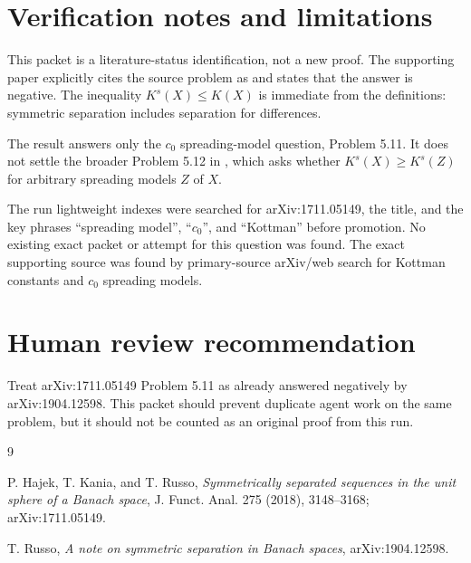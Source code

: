 \documentclass[11pt]{article}
\newcommand{\cnull}{c_0}
\newcommand{\Ks}{K^s}
\begin{document}
\section*{Verification notes and limitations}

This packet is a literature-status identification, not a new proof.  The
supporting paper explicitly cites the source problem as \cite[Problem
5.11]{HKR} and states that the answer is negative.  The inequality
\(\Ks(X)\leq K(X)\) is immediate from the definitions: symmetric separation
includes separation for differences.

The result answers only the \(\cnull\) spreading-model question, Problem 5.11.
It does not settle the broader Problem 5.12 in \cite{HKR}, which asks whether
\(\Ks(X)\geq \Ks(Z)\) for arbitrary spreading models \(Z\) of \(X\).

The run lightweight indexes were searched for arXiv:1711.05149, the title,
and the key phrases ``spreading model'', ``\(c_0\)'', and ``Kottman'' before
promotion.  No existing exact packet or attempt for this question was found.
The exact supporting source was found by primary-source arXiv/web search for
Kottman constants and \(c_0\) spreading models.

\section*{Human review recommendation}

Treat arXiv:1711.05149 Problem 5.11 as already answered negatively by
arXiv:1904.12598.  This packet should prevent duplicate agent work on the
same problem, but it should not be counted as an original proof from this run.

\begin{thebibliography}{9}

P. Hajek, T. Kania, and T. Russo,
\emph{Symmetrically separated sequences in the unit sphere of a Banach space},
J. Funct. Anal. 275 (2018), 3148--3168; arXiv:1711.05149.

T. Russo,
\emph{A note on symmetric separation in Banach spaces},
arXiv:1904.12598.

\end{thebibliography}
\end{document}
